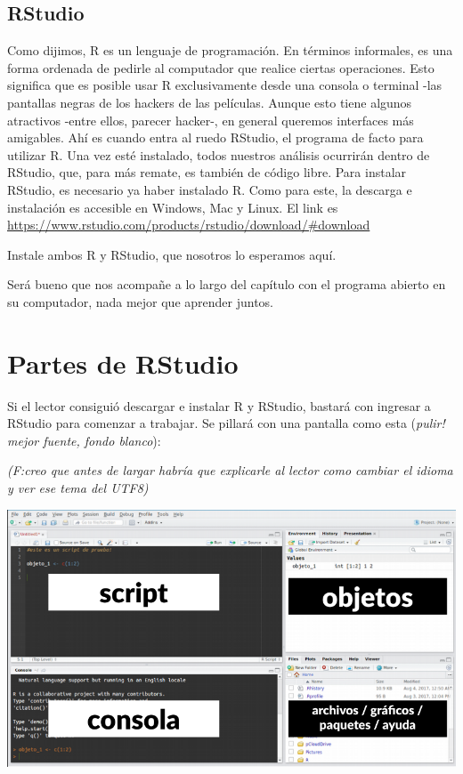 \documentclass[]{book}
\begin{document}
\hypertarget{rstudio}{%
\subsection{RStudio}\label{rstudio}}

Como dijimos, R es un lenguaje de programación. En términos informales,
es una forma ordenada de pedirle al computador que realice ciertas
operaciones. Esto significa que es posible usar R exclusivamente desde
una consola o terminal -las pantallas negras de los hackers de las
películas. Aunque esto tiene algunos atractivos -entre ellos, parecer
hacker-, en general queremos interfaces más amigables. Ahí es cuando
entra al ruedo RStudio, el programa de facto para utilizar R. Una vez
esté instalado, todos nuestros análisis ocurrirán dentro de RStudio,
que, para más remate, es también de código libre. Para instalar RStudio,
es necesario ya haber instalado R. Como para este, la descarga e
instalación es accesible en Windows, Mac y Linux. El link es
\url{https://www.rstudio.com/products/rstudio/download/\#download}

Instale ambos R y RStudio, que nosotros lo esperamos aquí.

Será bueno que nos acompañe a lo largo del capítulo con el programa
abierto en su computador, nada mejor que aprender juntos.

\hypertarget{partes-de-rstudio}{%
\section{Partes de RStudio}\label{partes-de-rstudio}}

Si el lector consiguió descargar e instalar R y RStudio, bastará con
ingresar a RStudio para comenzar a trabajar. Se pillará con una pantalla
como esta (\emph{pulir! mejor fuente, fondo blanco}):

\emph{(F:creo que antes de largar habría que explicarle al lector como
cambiar el idioma y ver ese tema del UTF8)}

\begin{center}\includegraphics[width=11.53in]{00-images/rbas-rstudio} \end{center}
\end{document}
